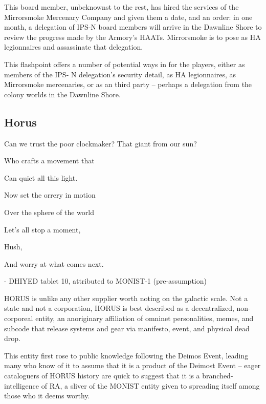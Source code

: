 This board member, unbeknownst to the rest, has hired the services of the Mirrorsmoke
Mercenary Company and given them a date, and an order: in one month, a delegation of IPS-N
board members will arrive in the Dawnline Shore to review the progress made by the Armory's
HAATs. Mirrorsmoke is to pose as HA legionnaires and assassinate that delegation.

This flashpoint offers a number of potential ways in for the players, either as members of the IPS-
N delegation's security detail, as HA legionnaires, as Mirrorsmoke mercenaries, or as an third
party -- perhaps a delegation from the colony worlds in the Dawnline Shore.

\subsection{Horus}
\begin{loreQuote}
                                    Can we trust the poor clockmaker? That giant from our
                                    sun?

                                     Who crafts a movement that

                                     Can quiet all this light.

                                    Now set the orrery in motion

                                     Over the sphere of the world

                                    Let's all stop a moment,

                                    Hush,

                                    And worry at what comes next.

                                    \qquad - \quad \textnormal{DHIYED tablet 10, attributed to MONIST-1 (pre-assumption)}
\end{loreQuote}

HORUS is unlike any other supplier worth noting on the galactic scale. Not a state and not a
corporation, HORUS is best described as a decentralized, non-corporeal entity, an anoriginary
affiliation of omninet personalities, memes, and subcode that release systems and gear via
manifesto, event, and physical dead drop.

This entity first rose to public knowledge following the Deimos Event, leading many who know of it
to assume that it is a product of the Deimost Event -- eager cataloguers of HORUS history are
quick to suggest that it is a branched-intelligence of RA, a sliver of the MONIST entity given to
spreading itself among those who it deems worthy.

